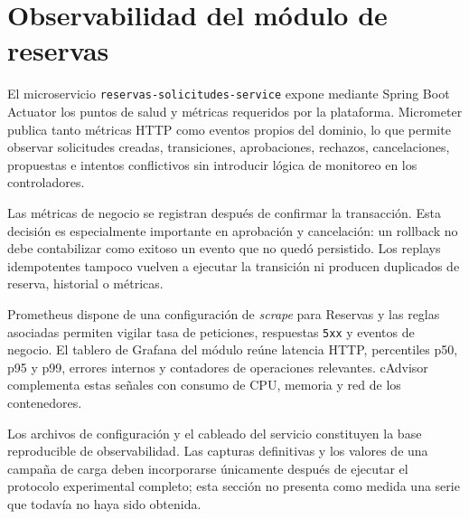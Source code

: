 \section{Observabilidad del módulo de reservas}
\label{sec:observabilidad-reservas}

El microservicio \texttt{reservas-solicitudes-service} expone mediante
Spring Boot Actuator los puntos de salud y métricas requeridos por la
plataforma. Micrometer publica tanto métricas HTTP como eventos propios del
dominio, lo que permite observar solicitudes creadas, transiciones,
aprobaciones, rechazos, cancelaciones, propuestas e intentos conflictivos
sin introducir lógica de monitoreo en los controladores.

Las métricas de negocio se registran después de confirmar la transacción.
Esta decisión es especialmente importante en aprobación y cancelación: un
rollback no debe contabilizar como exitoso un evento que no quedó
persistido. Los replays idempotentes tampoco vuelven a ejecutar la
transición ni producen duplicados de reserva, historial o métricas.

Prometheus dispone de una configuración de \emph{scrape} para Reservas y
las reglas asociadas permiten vigilar tasa de peticiones, respuestas
\texttt{5xx} y eventos de negocio. El tablero de Grafana del módulo reúne
latencia HTTP, percentiles p50, p95 y p99, errores internos y contadores de
operaciones relevantes. cAdvisor complementa estas señales con consumo de
CPU, memoria y red de los contenedores.

Los archivos de configuración y el cableado del servicio constituyen la
base reproducible de observabilidad. Las capturas definitivas y los valores
de una campaña de carga deben incorporarse únicamente después de ejecutar
el protocolo experimental completo; esta sección no presenta como medida
una serie que todavía no haya sido obtenida.

